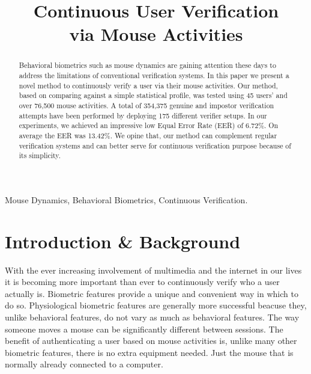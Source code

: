 \documentclass[conference]{IEEEtran}
\begin{document}
\title{Continuous User Verification\\via Mouse Activities}


\author{
}


\maketitle


\begin{abstract}
Behavioral biometrics such as mouse dynamics are gaining attention these days to address the limitations of
conventional verification systems. In this paper we present a novel method to continuously verify a user via
their mouse activities. Our method, based on comparing against a simple statistical profile, was tested using 45 users’ and over 76,500 mouse activities.
A total of 354,375 genuine and impostor verification attempts have been performed by deploying 175 different verifier
setups. In our experiments, we achieved an impressive low Equal Error Rate (EER) of 6.72\%. On average the EER
was 13.42\%. We opine that, our method can complement regular verification systems and can better serve for
continuous verification purpose because of its simplicity.
\end{abstract}
\begin{IEEEkeywords} 
Mouse Dynamics,
Behavioral Biometrics,
Continuous Verification.
 \end{IEEEkeywords}
\IEEEpeerreviewmaketitle

\section{Introduction \& Background}

With the ever increasing involvement of multimedia and the internet in our lives it is becoming more important than ever to continuously verify who a user actually is. Biometric features provide a unique and convenient way in which to do so. Physiological biometric features are generally more successful beacuse they, unlike behavioral features, do not vary as much as behavioral features. The way someone moves a mouse can be significantly different between sessions. The benefit of authenticating a user based on mouse activities is, unlike many other biometric features, there is no extra equipment needed. Just the mouse that is normally already connected to a computer.
\end{document}

